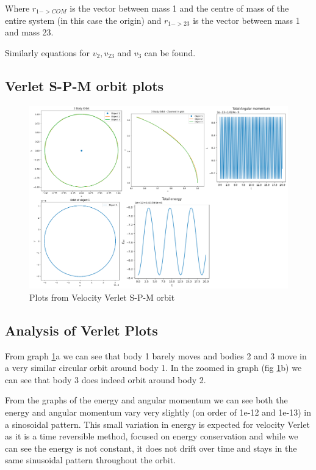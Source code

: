 \documentclass[11pt]{article}
\begin{document}
Where $r_{1->COM}$ is the vector between mass 1 and the centre of mass of the entire system (in this case the origin) and $r_{1->23}$ is the vector between mass 1 and mass 23.

Similarly equations for $v_2, v_{23}$ and $v_3$ can be found.


\subsection{Verlet S-P-M orbit plots}

\begin{figure}[!ht]
\centerline{\includegraphics[scale=0.39]{Pictures/SEM_verlet_cor.png}}
\caption{Plots from Velocity Verlet S-P-M orbit}
\label{SEM_verlet}
\end{figure}


\subsection{Analysis of Verlet Plots}

From graph \ref{SEM_verlet}a we can see that body 1 barely moves and bodies 2 and 3 move in a very similar circular orbit around body 1. In the zoomed in graph (fig \ref{SEM_verlet}b) we can see that body 3 does indeed orbit around body 2.
\smallskip

From the graphs of the energy and angular momentum we can see both the energy and angular momentum vary very slightly (on order of 1e-12 and 1e-13) in a sinosoidal pattern. This small variation in energy is expected for velocity Verlet as it is a time reversible method, focused on energy conservation and while we can see the energy is not constant, it does not drift over time and stays in the same sinusoidal pattern throughout the orbit.
\end{document}
